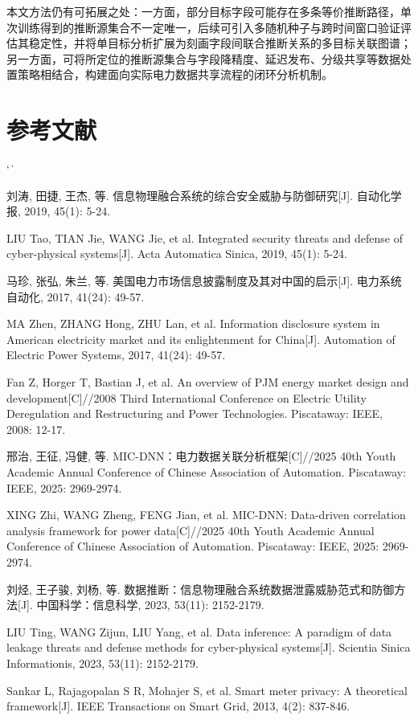 \documentclass[UTF8,zihao=5,twoside]{ctexart}
\makeatletter
\numberwithin{equation}{section}
\renewcommand{\refname}{参考文献}
\renewenvironment{thebibliography}[1]{%
  \section*{\refname}%
  \small
  \list{[\arabic{enumi}]}{%
    \settowidth\labelwidth{[#1]}%
    \leftmargin\labelwidth
    \advance\leftmargin\labelsep
    \usecounter{enumi}}
  \sloppy\clubpenalty4000\widowpenalty4000\sfcode`\.\ \@m
}{\def\@noitemerr{\@latex@warning{Empty `thebibliography' environment}}\endlist}
\makeatother
\begin{document}
本文方法仍有可拓展之处：一方面，部分目标字段可能存在多条等价推断路径，单次训练得到的推断源集合不一定唯一，后续可引入多随机种子与跨时间窗口验证评估其稳定性，并将单目标分析扩展为刻画字段间联合推断关系的多目标关联图谱；另一方面，可将所定位的推断源集合与字段降精度、延迟发布、分级共享等数据处置策略\cite{ref-zhu-sharing}相结合，构建面向实际电力数据共享流程的闭环分析机制。

\balance
\begin{thebibliography}{99}
刘涛, 田捷, 王杰, 等. 信息物理融合系统的综合安全威胁与防御研究[J]. 自动化学报, 2019, 45(1): 5-24.

LIU Tao, TIAN Jie, WANG Jie, et al. Integrated security threats and defense of cyber-physical systems[J]. Acta Automatica Sinica, 2019, 45(1): 5-24.

马珍, 张弘, 朱兰, 等. 美国电力市场信息披露制度及其对中国的启示[J]. 电力系统自动化, 2017, 41(24): 49-57.

MA Zhen, ZHANG Hong, ZHU Lan, et al. Information disclosure system in American electricity market and its enlightenment for China[J]. Automation of Electric Power Systems, 2017, 41(24): 49-57.

Fan Z, Horger T, Bastian J, et al. An overview of PJM energy market design and development[C]//2008 Third International Conference on Electric Utility Deregulation and Restructuring and Power Technologies. Piscataway: IEEE, 2008: 12-17.

邢治, 王征, 冯健, 等. MIC-DNN：电力数据关联分析框架[C]//2025 40th Youth Academic Annual Conference of Chinese Association of Automation. Piscataway: IEEE, 2025: 2969-2974.

XING Zhi, WANG Zheng, FENG Jian, et al. MIC-DNN: Data-driven correlation analysis framework for power data[C]//2025 40th Youth Academic Annual Conference of Chinese Association of Automation. Piscataway: IEEE, 2025: 2969-2974.

刘烃, 王子骏, 刘杨, 等. 数据推断：信息物理融合系统数据泄露威胁范式和防御方法[J]. 中国科学：信息科学, 2023, 53(11): 2152-2179.

LIU Ting, WANG Zijun, LIU Yang, et al. Data inference: A paradigm of data leakage threats and defense methods for cyber-physical systems[J]. Scientia Sinica Informationis, 2023, 53(11): 2152-2179.

Sankar L, Rajagopalan S R, Mohajer S, et al. Smart meter privacy: A theoretical framework[J]. IEEE Transactions on Smart Grid, 2013, 4(2): 837-846.


\end{thebibliography}
\end{document}
